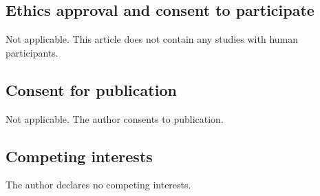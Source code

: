 \documentclass[11pt]{article}
\begin{document}
\subsection*{Ethics approval and consent to participate}
Not applicable. This article does not contain any studies with human participants.

\subsection*{Consent for publication}
Not applicable. The author consents to publication.

\subsection*{Competing interests}
The author declares no competing interests.
\end{document}
